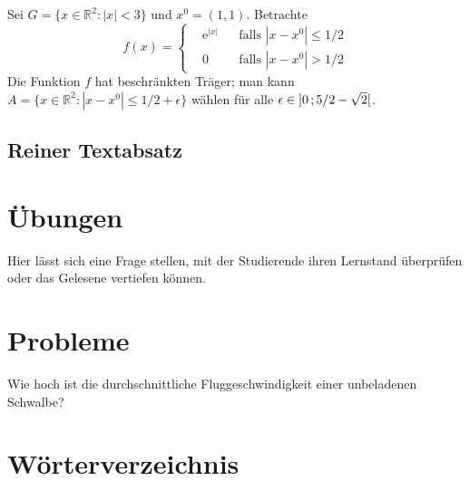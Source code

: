 \begin{example}
	Sei $G=\{x\in\mathbb{R}^2:|x|<3\}$ und $x^0=(1,1)$. Betrachte
	\begin{equation}
		f(x)=\left\{\begin{aligned}
			& \mathrm{e}^{|x|} & & \text{falls $|x-x^0|\leq 1/2$}\\
			& 0                & & \text{falls $|x-x^0| > 1/2$}
		\end{aligned}\right.
	\end{equation}
	Die Funktion $f$ hat beschränkten Träger; man kann
	$A=\{x\in\mathbb{R}^2:|x-x^0|\leq 1/2+\epsilon\}$ wählen für alle
	$\epsilon\in\mathopen{]}0\,;5/2-\sqrt{2}\mathclose{[}$.
\end{example}

\subsection{Reiner Textabsatz}

\begin{example}
	\lipsum[2]
\end{example}


\section{Übungen}

\begin{exercise}
	Hier lässt sich eine Frage stellen, mit der Studierende ihren Lernstand
	überprüfen oder das Gelesene vertiefen können.
\end{exercise}


\section{Probleme}

\begin{problem}
	Wie hoch ist die durchschnittliche Fluggeschwindigkeit einer unbeladenen
	Schwalbe?
\end{problem}


\section{Wörterverzeichnis}

